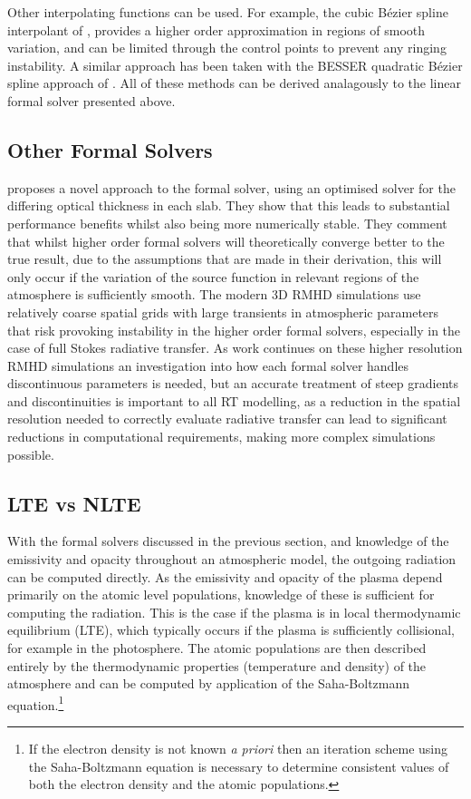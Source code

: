 Other interpolating functions can be used. For example, the cubic Bézier spline interpolant of \citet{DelaCruzRodriguez2013}, provides a higher order approximation in regions of smooth variation, and can be limited through the control points to prevent any ringing instability. A similar approach has been taken with the BESSER quadratic Bézier spline approach of \citet{Stepan2013}.
All of these methods can be derived analagously to the linear formal solver presented above.

\subsection{Other Formal Solvers}

\citet{Janett2018} proposes a novel approach to the formal solver,  using an optimised solver for the differing optical thickness in each slab. They show that this leads to substantial performance benefits whilst also being more numerically stable. They comment that whilst higher order formal solvers will theoretically converge better to the true result, due to the assumptions that are made in their derivation, this will only occur if the variation of the source function in relevant regions of the atmosphere is sufficiently smooth. The modern 3D RMHD simulations use relatively coarse spatial grids with large transients in atmospheric parameters that risk provoking instability in the higher order formal solvers, especially in the case of full Stokes radiative transfer.
As work continues on these higher resolution RMHD simulations an investigation into how each formal solver handles discontinuous parameters is needed, but an accurate treatment of steep gradients and discontinuities is important to all RT modelling, as a reduction in the spatial resolution needed to correctly evaluate radiative transfer can lead to significant reductions in computational requirements, making more complex simulations possible.


\subsection{LTE vs NLTE}


With the formal solvers discussed in the previous section, and knowledge of the emissivity and opacity throughout an atmospheric model, the outgoing radiation can be computed directly. As the emissivity and opacity of the plasma depend primarily on the atomic level populations, knowledge of these is sufficient for computing the radiation.
This is the case if the plasma is in local thermodynamic equilibrium (LTE), which typically occurs if the plasma is sufficiently collisional, for example in the photosphere. The atomic populations are then described entirely by the thermodynamic properties (temperature and density) of the atmosphere and can be computed by application of the Saha-Boltzmann equation.\footnote{If the electron density is not known \textit{a priori} then an iteration scheme using the Saha-Boltzmann equation is necessary to determine consistent values of both the electron density and the atomic populations.}

